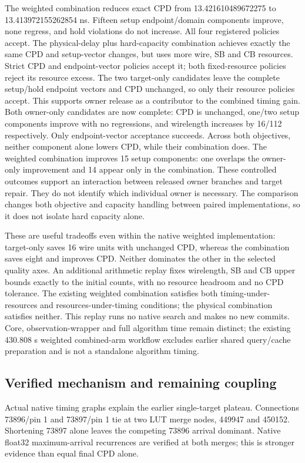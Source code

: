 The weighted combination reduces exact CPD from 13.421610489672275 to 13.413972155262854 ns. Fifteen setup endpoint/domain components improve, none regress, and hold violations do not increase. All four registered policies accept. The physical-delay plus hard-capacity combination achieves exactly the same CPD and setup-vector changes, but uses more wire, SB and CB resources. Strict CPD and endpoint-vector policies accept it; both fixed-resource policies reject its resource excess. The two target-only candidates leave the complete setup/hold endpoint vectors and CPD unchanged, so only their resource policies accept. This supports owner release as a contributor to the combined timing gain. Both owner-only candidates are now complete: CPD is unchanged, one/two setup components improve with no regressions, and wirelength increases by 16/112 respectively. Only endpoint-vector acceptance succeeds. Across both objectives, neither component alone lowers CPD, while their combination does. The weighted combination improves 15 setup components: one overlaps the owner-only improvement and 14 appear only in the combination. These controlled outcomes support an interaction between released owner branches and target repair. They do not identify which individual owner is necessary. The comparison changes both objective and capacity handling between paired implementations, so it does not isolate hard capacity alone.

These are useful tradeoffs even within the native weighted implementation: target-only saves 16 wire units with unchanged CPD, whereas the combination saves eight and improves CPD. Neither dominates the other in the selected quality axes. An additional arithmetic replay fixes wirelength, SB and CB upper bounds exactly to the initial counts, with no resource headroom and no CPD tolerance. The existing weighted combination satisfies both timing-under-resources and resources-under-timing conditions; the physical combination satisfies neither. This replay runs no native search and makes no new commits. Core, observation-wrapper and full algorithm time remain distinct; the existing 430.808 s weighted combined-arm workflow excludes earlier shared query/cache preparation and is not a standalone algorithm timing.

\subsection{Verified mechanism and remaining coupling}
Actual native timing graphs explain the earlier single-target plateau. Connections 73896/pin 1 and 73897/pin 1 tie at two LUT merge nodes, 449947 and 450152. Shortening 73897 alone leaves the competing 73896 arrival dominant. Native float32 maximum-arrival recurrences are verified at both merges; this is stronger evidence than equal final CPD alone.

